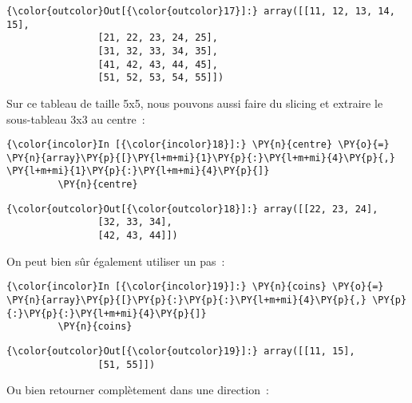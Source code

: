 \begin{Verbatim}[commandchars=\\\{\},frame=single,framerule=0.3mm,rulecolor=\color{cellframecolor}]
{\color{outcolor}Out[{\color{outcolor}17}]:} array([[11, 12, 13, 14, 15],
                [21, 22, 23, 24, 25],
                [31, 32, 33, 34, 35],
                [41, 42, 43, 44, 45],
                [51, 52, 53, 54, 55]])
\end{Verbatim}
            
    Sur ce tableau de taille 5x5, nous pouvons aussi faire du slicing et
extraire le sous-tableau 3x3 au centre~:

    \begin{Verbatim}[commandchars=\\\{\},frame=single,framerule=0.3mm,rulecolor=\color{cellframecolor}]
{\color{incolor}In [{\color{incolor}18}]:} \PY{n}{centre} \PY{o}{=} \PY{n}{array}\PY{p}{[}\PY{l+m+mi}{1}\PY{p}{:}\PY{l+m+mi}{4}\PY{p}{,} \PY{l+m+mi}{1}\PY{p}{:}\PY{l+m+mi}{4}\PY{p}{]}
         \PY{n}{centre}
\end{Verbatim}


\begin{Verbatim}[commandchars=\\\{\},frame=single,framerule=0.3mm,rulecolor=\color{cellframecolor}]
{\color{outcolor}Out[{\color{outcolor}18}]:} array([[22, 23, 24],
                [32, 33, 34],
                [42, 43, 44]])
\end{Verbatim}
            
    On peut bien sûr également utiliser un pas~:

    \begin{Verbatim}[commandchars=\\\{\},frame=single,framerule=0.3mm,rulecolor=\color{cellframecolor}]
{\color{incolor}In [{\color{incolor}19}]:} \PY{n}{coins} \PY{o}{=} \PY{n}{array}\PY{p}{[}\PY{p}{:}\PY{p}{:}\PY{l+m+mi}{4}\PY{p}{,} \PY{p}{:}\PY{p}{:}\PY{l+m+mi}{4}\PY{p}{]}
         \PY{n}{coins}
\end{Verbatim}


\begin{Verbatim}[commandchars=\\\{\},frame=single,framerule=0.3mm,rulecolor=\color{cellframecolor}]
{\color{outcolor}Out[{\color{outcolor}19}]:} array([[11, 15],
                [51, 55]])
\end{Verbatim}
            
    Ou bien retourner complètement dans une direction~:

